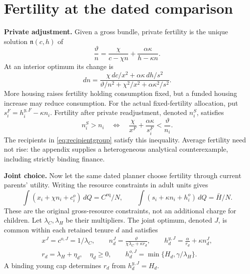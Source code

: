 \documentclass[11pt]{article}
\newcommand{\dd}{\,d}
\newcommand{\eq}{\mathrm{eq}}
\newcommand{\HH}{\bar H}
\newcommand{\tht}{\vartheta}
\begin{document}
\section{Fertility at the dated comparison}
\textbf{Private adjustment.} Given a gross bundle, private fertility is the unique solution $\mathfrak n(c,h)$ of
\begin{equation}
 \frac\tht n=\frac\chi{c-\chi n}+\frac{\alpha\kappa}{h-\kappa n}.\label{eq:fertilityFOC}
\end{equation}
At an interior optimum its change is
\begin{equation}
 dn=\frac{\chi\,dc/x^2+\alpha\kappa\,dh/s^2}
 {\tht/n^2+\chi^2/x^2+\alpha\kappa^2/s^2}.\label{eq:fertilityderivative}
\end{equation}
More housing raises fertility holding consumption fixed, but a funded housing increase may reduce consumption. For the actual fixed-fertility allocation, put $s_i^F=h_i^{y,F}-\kappa n_i$. Fertility after private readjustment, denoted $n_i^S$, satisfies
\begin{equation}
 n_i^S>n_i\quad\Longleftrightarrow\quad
 \frac\chi{x^F}+\frac{\alpha\kappa}{s_i^F}<\frac\tht{n_i}.\label{eq:sequential}
\end{equation}
The recipients in \eqref{eq:recipientgroup} satisfy this inequality. Average fertility need not rise: the appendix supplies a heterogeneous analytical counterexample, including strictly binding finance.

\textbf{Joint choice.} Now let the same dated planner choose fertility through current parents' utility. Writing the resource constraints in adult units gives
\[
 \int(x_i+\chi n_i+c_i^o)\dd Q=C^{\eq}/N,\qquad
 \int(s_i+\kappa n_i+h_i^o)\dd Q=\HH/N.
\]
These are the original gross-resource constraints, not an additional charge for children. Let $\lambda_C,\lambda_H$ be their multipliers. The joint optimum, denoted $J$, is common within each retained tenure $d$ and satisfies
\begin{equation}
 \begin{gathered}
 x^J=c^{o,J}=1/\lambda_C,\qquad
 n_d^J=\frac\tht{\chi\lambda_C+\kappa r_d},\qquad
 h_d^{y,J}=\frac\alpha{r_d}+\kappa n_d^J,\\
 r_d=\lambda_H+\eta_d,\quad \eta_d\ge0,\qquad
 h_d^{o,J}=\min\{H_d,\gamma/\lambda_H\}.
 \end{gathered}\label{eq:jointKKT}
\end{equation}
A binding young cap determines $r_d$ from $h_d^{y,J}=H_d$.
\end{document}
